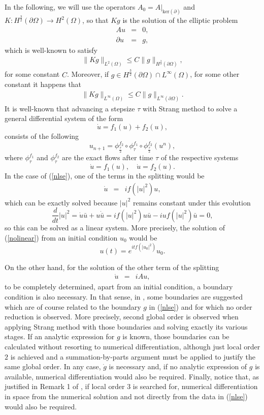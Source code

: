 \documentclass[10pt,a4paper]{amsart}
\begin{document}
In the following, we will use the operators $A_0=A|_{\mbox{ker}(\partial)}$ and $K: H^{\frac{3}{2}}(\partial \Omega) \to H^2(\Omega)$, so that $K g$ is the solution of the elliptic problem
\begin{eqnarray}
A u &=&0, \nonumber \\
\partial u&=&g, \nonumber
\end{eqnarray}
which is well-known to satisfy \cite{ACP}
\begin{eqnarray}
\|Kg \|_{L^2(\Omega)}\le C \|g\|_{H^{\frac{3}{2}}(\partial \Omega)},
\nonumber
\end{eqnarray}
for some constant $C$.
Moreover, if $g \in H^{\frac{3}{2}}(\partial \Omega)\cap L^{\infty}(\Omega)$, for some other constant it happens that \cite{S}
\begin{eqnarray}
\|Kg \|_{L^\infty(\Omega)}\le C \|g\|_{L^\infty(\partial \Omega)}.
\label{acotK2}
\end{eqnarray}
It is well-known that advancing a stepsize $\tau$ with Strang method to solve a general differential system of the form
$$\dot{u}=f_1(u)+f_2(u),$$
consists of the following
$$u_{n+1}=\phi_{\frac{\tau}{2}}^{f_2}\circ\phi_{\tau}^{f_1}\circ\phi_{\frac{\tau}{2}}^{f_2}(u^n),$$
where $\phi_\tau^{f_1}$ and $\phi_\tau^{f_2}$ are the exact flows after time $\tau$ of the respective systems
$$
\dot{u}=f_1(u), \quad \dot{u}=f_2(u).$$
In the case of
(\ref{nlse}), one of the terms in the splitting would be
\begin{eqnarray}
\dot{u}&=& i f(|u|^2) u, \label{nolinear}
\end{eqnarray}
which can be exactly solved because $|u|^2$ remains constant under this evolution \cite{WH}
$$
\frac{d}{dt} |u|^2= \dot{u} \bar{u}+ u \dot{\bar{u}}=i f(|u|^2) u  \bar{u}-i u f(|u|^2) \bar{u}=0,$$
so this can be solved as a linear system. More precisely, the solution of (\ref{nolinear}) from an initial condition $u_0$ would be
$$
u(t)=e^{i t f(|u_0|^2)}u_0.$$

On the other hand, for the solution of the other term of the splitting
\begin{eqnarray}
\dot{u}&=& i A u, \label{linear}
\end{eqnarray}
to be completely determined, apart from an initial condition, a boundary condition is also necessary. In that sense, in \cite{CR}, some boundaries are suggested which are of course related to the boundary $g$ in (\ref{nlse}) and for which no order reduction is observed. More precisely, second global order is observed when applying Strang method with those boundaries and solving exactly its various stages. If an analytic expression for $g$ is known, those boundaries can be calculated without resorting to numerical differentiation, although just local order $2$ is achieved and a summation-by-parts argument must be applied to justify the same global order. In any case, $\dot{g}$ is necessary and, if no analytic expression of $g$ is available, numerical differentiation would also be required. Finally, notice that, as justified in Remark 1 of \cite{CR}, if local order $3$ is searched for, numerical differentiation in space from the numerical solution and not directly from the data in (\ref{nlse}) would also be required.
\end{document}
